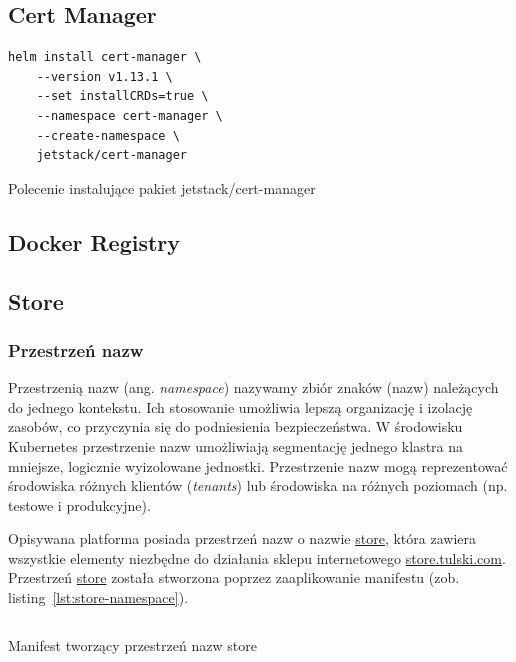 \subsection{Cert Manager}\label{subsec:cert-manager}


\begin{listing}[H]
    \begin{verbatim}
helm install cert-manager \
    --version v1.13.1 \
    --set installCRDs=true \
    --namespace cert-manager \
    --create-namespace \
    jetstack/cert-manager
    \end{verbatim}
    \caption{Polecenie instalujące pakiet jetstack/cert-manager}
    \label{lst:helm-install-cert-manager}
\end{listing}

\subsection{Docker Registry}\label{subsec:docker-registry}

\todo{Docker Registry}

\subsection{Store}\label{subsec:store}

\subsubsection{Przestrzeń nazw}

Przestrzenią nazw (ang. \emph{namespace}) nazywamy zbiór znaków (nazw) należących do jednego kontekstu.
Ich stosowanie umożliwia lepszą organizację i izolację zasobów, co przyczynia się do podniesienia bezpieczeństwa.
W środowisku Kubernetes przestrzenie nazw umożliwiają segmentację jednego klastra na mniejsze, logicznie wyizolowane jednostki.
Przestrzenie nazw mogą reprezentować środowiska różnych klientów (\emph{tenants}) lub środowiska na różnych poziomach (np. testowe i produkcyjne).

Opisywana platforma posiada przestrzeń nazw o nazwie \url{store}, która zawiera wszystkie elementy niezbędne do działania sklepu internetowego \url{store.tulski.com}.
Przestrzeń \url{store} została stworzona poprzez zaaplikowanie manifestu (zob. listing~\ref{lst:store-namespace}).

\begin{listing}[H]
    \inputminted[xleftmargin=20pt,linenos]{yaml}{code/store-namespace.yaml}
    \caption{Manifest tworzący przestrzeń nazw store}
    \label{lst:store-namespace}
\end{listing}

